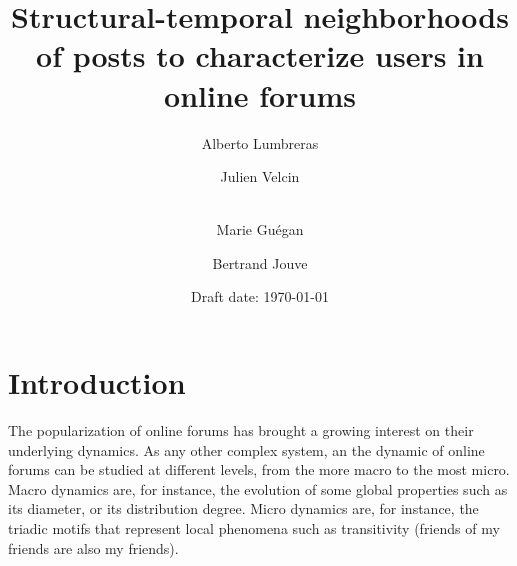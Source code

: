 \documentclass[smallextended]{svjour3}          %
\begin{document}
\title{Structural-temporal neighborhoods of posts to characterize users in online forums}

\author{Alberto Lumbreras \and
        Julien Velcin  \and\\
        Marie Guégan \and
        Bertrand Jouve
}


\date{Draft date: \today}

\maketitle

\section{Introduction}\label{sec:introduction}

The popularization of online forums has brought a growing interest on their underlying dynamics. As any other complex system, an the dynamic of online forums can be studied at different levels, from the more macro to the most micro. Macro dynamics are, for instance, the evolution of some global properties such as its diameter, or its distribution degree. Micro dynamics are, for instance, the triadic motifs that represent local phenomena such as transitivity (friends of my friends are also my friends).
\end{document}
